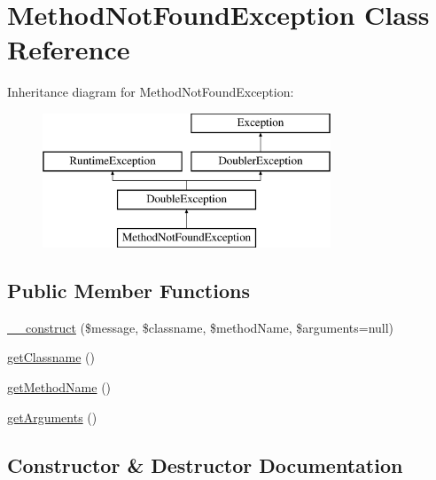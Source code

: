 \hypertarget{class_prophecy_1_1_exception_1_1_doubler_1_1_method_not_found_exception}{}\section{Method\+Not\+Found\+Exception Class Reference}
\label{class_prophecy_1_1_exception_1_1_doubler_1_1_method_not_found_exception}
Inheritance diagram for Method\+Not\+Found\+Exception\+:\begin{figure}[H]
\begin{center}
\leavevmode
\includegraphics[height=4.000000cm]{class_prophecy_1_1_exception_1_1_doubler_1_1_method_not_found_exception}
\end{center}
\end{figure}
\subsection*{Public Member Functions}
\begin{DoxyCompactItemize}
\item 
\mbox{\hyperlink{class_prophecy_1_1_exception_1_1_doubler_1_1_method_not_found_exception_ac905fc9ffb9907aed6b210642823c244}{\+\_\+\+\_\+construct}} (\$message, \$classname, \$method\+Name, \$arguments=null)
\item 
\mbox{\hyperlink{class_prophecy_1_1_exception_1_1_doubler_1_1_method_not_found_exception_a2de0f0e912c2f4137ae5ce2687ef8fc5}{get\+Classname}} ()
\item 
\mbox{\hyperlink{class_prophecy_1_1_exception_1_1_doubler_1_1_method_not_found_exception_a0fa2079426d0262e759c4105fa4e9163}{get\+Method\+Name}} ()
\item 
\mbox{\hyperlink{class_prophecy_1_1_exception_1_1_doubler_1_1_method_not_found_exception_a1d4c324c5a088be98d99d3efbf3502e1}{get\+Arguments}} ()
\end{DoxyCompactItemize}


\subsection{Constructor \& Destructor Documentation}
\mbox{\label{class_prophecy_1_1_exception_1_1_doubler_1_1_method_not_found_exception_ac905fc9ffb9907aed6b210642823c244}} 
